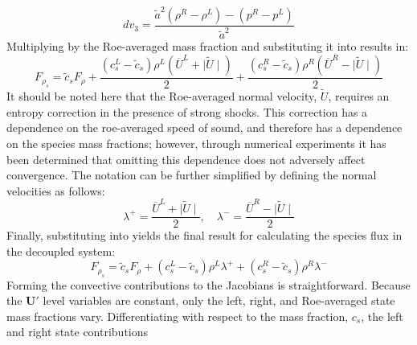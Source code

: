 \begin{equation}
	dv_3 = \frac{\tilde{a}^2 (\rho^R-\rho^L)-(p^R-p^L)}{\tilde{a}^2}
\end{equation}
Multiplying  by the Roe-averaged mass fraction and
substituting it into  results in:
\begin{equation}
\label{unsimp-sp-flux}
	F_{\rho_s} =\tilde{c}_s F_\rho + \frac{(c_s^L-\tilde{c}_s)\rho^L(\overline{U}^L+\mid \tilde{U}\mid)}{2}
	+ \frac{(c_s^R-\tilde{c}_s)\rho^R(\overline{U}^R-\mid \tilde{U}\mid)}{2}
\end{equation}
It should be noted here that the Roe-averaged normal velocity, $\tilde{U}$,
requires an entropy correction in the presence of strong shocks\cite{harten}.
This correction has a dependence on the roe-averaged speed of sound, and
therefore has a dependence on the species mass fractions; however,
through numerical experiments it has been determined that omitting this
dependence does not adversely affect convergence.  The notation can be further
simplified by defining the normal velocities as follows:
\begin{equation}
  \lambda^+ = \frac{\overline{U}^L+\mid \tilde{U}\mid}{2}, \quad 
  \lambda^- = \frac{\overline{U}^R-\mid \tilde{U}\mid}{2} 
  \label{lambda-pm} 
\end{equation}
Finally, substituting  into  yields the
final result for calculating the species flux in the decoupled system:
\begin{equation}
  F_{\rho_s} =
  \tilde{c}_s F_\rho 
  + (c_s^L-\tilde{c}_s)\rho^L\lambda^+ 
  + (c_s^R-\tilde{c}_s)\rho^R\lambda^-
  \label{sp-flux} 
\end{equation}
Forming the convective contributions to the Jacobians is straightforward.
Because the $\mathbf{U}'$ level variables are constant, only the left, right,
and Roe-averaged state mass fractions vary.  Differentiating 
with respect to the mass fraction, $c_s$, the left and right state contributions
